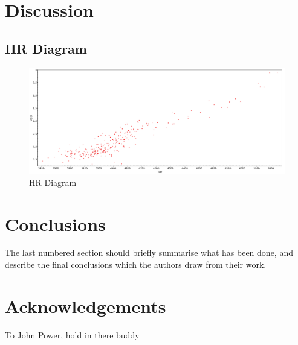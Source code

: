 \documentclass[a4paper,fleqn,usenatbib]{mnras}
\begin{document}
\section{Discussion}  \label{sec:dis}

\subsection{HR Diagram}
\begin{figure}
	\includegraphics[width=\columnwidth]{HRdummy.png}
    \caption{HR Diagram}
    \label{fig:figure2}
\end{figure}


\section{Conclusions} \label{sec:con}

The last numbered section should briefly summarise what has been done, and describe
the final conclusions which the authors draw from their work.

\section*{Acknowledgements}

To John Power, hold in there buddy
\end{document}
